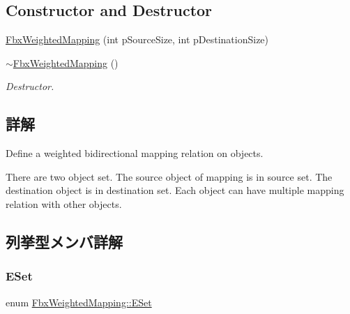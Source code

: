 \subsection*{Constructor and Destructor}
\begin{DoxyCompactItemize}
\item 
\hyperlink{class_fbx_weighted_mapping_a2ba4f4ee1f96910ed1931d83eee5fcaa}{Fbx\+Weighted\+Mapping} (int p\+Source\+Size, int p\+Destination\+Size)
\item 
\hyperlink{class_fbx_weighted_mapping_a30ea1b9d4a140bb8689c01619b5a0e93}{$\sim$\+Fbx\+Weighted\+Mapping} ()
\begin{DoxyCompactList}\small\item\em Destructor. \end{DoxyCompactList}\end{DoxyCompactItemize}


\subsection{詳解}
Define a weighted bidirectional mapping relation on objects.

There are two object set. The source object of mapping is in source set. The destination object is in destination set. Each object can have multiple mapping relation with other objects. 

\subsection{列挙型メンバ詳解}
\mbox{\label{class_fbx_weighted_mapping_a3fb59c162b0c5b278f00e7bad4c578c6}} 
\subsubsection{\texorpdfstring{E\+Set}{ESet}}
{\footnotesize\ttfamily enum \hyperlink{class_fbx_weighted_mapping_a3fb59c162b0c5b278f00e7bad4c578c6}{Fbx\+Weighted\+Mapping\+::\+E\+Set}}

